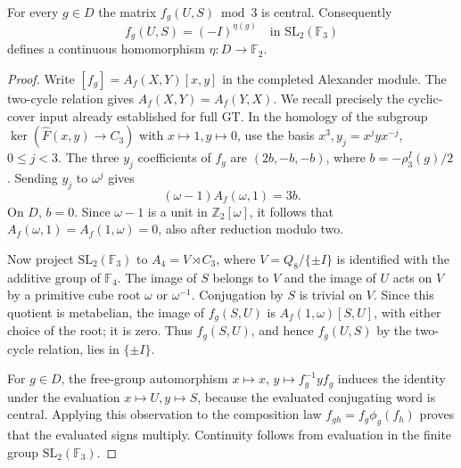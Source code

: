 \begin{lemma}\label{lem:common-sign}
For every $g\in D$ the matrix $f_g(U,S)\bmod3$ is central.
Consequently
\[
 f_g(U,S)=(-I)^{\eta(g)}\quad\text{in }\mathrm{SL}_2(\mathbb F_3)
\]
defines a continuous homomorphism $\eta:D\to\mathbb F_2$.
\end{lemma}
\begin{proof}
Write $[f_g]=A_f(X,Y)[x,y]$ in the completed Alexander module.
The two-cycle relation gives $A_f(X,Y)=A_f(Y,X)$.
We recall precisely the cyclic-cover input already established for
full GT.  In the homology of the subgroup
$\ker(\widehat F(x,y)\to C_3)$ with $x\mapsto1,y\mapsto0$,
use the basis $x^3,y_j=x^jyx^{-j}$, $0\le j<3$.
The three $y_j$ coefficients of $f_g$ are
$(2b,-b,-b)$, where $b=-\rho_3^I(g)/2$.
Sending $y_j$ to $\omega^j$ gives
\[
 (\omega-1)A_f(\omega,1)=3b.
\]
On $D$, $b=0$.  Since $\omega-1$ is a unit in
$\mathbb Z_2[\omega]$, it follows that
$A_f(\omega,1)=A_f(1,\omega)=0$, also after reduction modulo two.

Now project $\mathrm{SL}_2(\mathbb F_3)$ to
$A_4=V\rtimes C_3$, where $V=Q_8/\{\pm I\}$ is identified
with the additive group of $\mathbb F_4$.
The image of $S$ belongs to $V$ and the image of $U$ acts on
$V$ by a primitive cube root $\omega$ or $\omega^{-1}$.
Conjugation by $S$ is trivial on $V$.  Since this quotient is
metabelian, the image of $f_g(S,U)$ is
$A_f(1,\omega)[S,U]$, with either choice of the root; it is zero.
Thus $f_g(S,U)$, and hence $f_g(U,S)$ by the two-cycle relation,
lies in $\{\pm I\}$.

For $g\in D$, the free-group automorphism
$x\mapsto x$, $y\mapsto f_g^{-1}yf_g$ induces the identity under
the evaluation $x\mapsto U,y\mapsto S$, because the evaluated
conjugating word is central.  Applying this observation to the
composition law $f_{gh}=f_g\phi_g(f_h)$ proves that the evaluated
signs multiply.  Continuity follows from evaluation in the finite
group $\mathrm{SL}_2(\mathbb F_3)$.
\end{proof}

